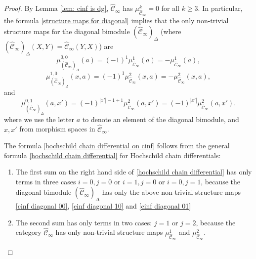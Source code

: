 \documentclass[11pt]{amsproc}
\def\cc{\mathcal{C}}
\def\D{\Delta}
\def\cinf{\widehat{\cc}_{\infty}}
\theoremstyle{remark}
\numberwithin{equation}{section}
\begin{document}
\begin{proof}
By Lemma \ref{lem: cinf is dg}, $\cinf$ has $\mu^{k}_{\cinf} = 0$ for all $k \ge 3$.
In particular, the formula \eqref{structure maps for diagonal} implies that the only non-trivial structure maps for the diagonal bimodule $(\cinf)_{\D}$ (where $(\cinf)_{\D}(X, Y) = \cinf(Y, X)$) are
\begin{equation}\label{cinf diagonal 00}
\mu^{0,0}_{(\cinf)_{\D}}(a) = (-1)^{1} \mu^{1}_{\cinf}(a) = -\mu^{1}_{\cinf}(a),
\end{equation}
\begin{equation}\label{cinf diagonal 10}
\mu^{1,0}_{(\cinf)_{\D}}(x, a) = (-1)^{1} \mu^{2}_{\cinf}(x, a) = -\mu^{2}_{\cinf}(x, a),
\end{equation}
and 
\begin{equation}\label{cinf diagonal 01}
\mu^{0,1}_{(\cinf)_{\D}}(a, x') = (-1)^{|x'|-1+1} \mu^{2}_{\cinf}(a, x') = (-1)^{|x'|} \mu^{2}_{\cinf}(a, x').
\end{equation}
where we use the letter $a$ to denote an element of the diagonal bimodule, and $x, x'$ from morphism spaces in $\cinf$.

The formula \eqref{hochschild chain differential on cinf} follows from the general formula \eqref{hochschild chain differential} for Hochschild chain differentials:
\begin{enumerate}[label=(\roman*)]

\item The first sum on the right hand side of \eqref{hochschild chain differential} has only terms in three cases $i=0, j=0$ or $i=1,j=0$ or $i=0,j=1$, because the diagonal bimodule $(\cinf)_{\D}$ has only the above non-trivial structure maps \eqref{cinf diagonal 00}, \eqref{cinf diagonal 10} and \eqref{cinf diagonal 01}

\item The second sum has only terms in two cases: $j=1$ or $j=2$, because the category $\cinf$ has only non-trivial structure maps $\mu_{\cinf}^{1}$ and $\mu_{\cinf}^{2}$.

\end{enumerate}
\end{proof}
\end{document}
